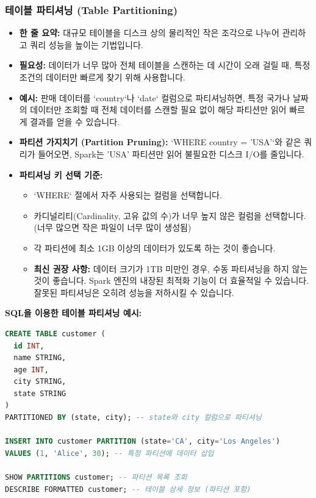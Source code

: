 \documentclass[11pt,a4paper]{article}
\begin{document}
\subsubsection{테이블 파티셔닝 (Table Partitioning)}
\begin{itemize}
    \item \textbf{한 줄 요약:} 대규모 테이블을 디스크 상의 물리적인 작은 조각으로 나누어 관리하고 쿼리 성능을 높이는 기법입니다.
    \item \textbf{필요성:} 데이터가 너무 많아 전체 테이블을 스캔하는 데 시간이 오래 걸릴 때, 특정 조건의 데이터만 빠르게 찾기 위해 사용합니다.
    \item \textbf{예시:} 판매 데이터를 `country`나 `date` 컬럼으로 파티셔닝하면, 특정 국가나 날짜의 데이터만 조회할 때 전체 데이터를 스캔할 필요 없이 해당 파티션만 읽어 빠르게 결과를 얻을 수 있습니다.
    \item \textbf{파티션 가지치기 (Partition Pruning):} `WHERE country = 'USA'`와 같은 쿼리가 들어오면, Spark는 'USA' 파티션만 읽어 불필요한 디스크 I/O를 줄입니다.
    \item \textbf{파티셔닝 키 선택 기준:}
    \begin{itemize}
        \item `WHERE` 절에서 자주 사용되는 컬럼을 선택합니다.
        \item 카디널리티(Cardinality, 고유 값의 수)가 너무 높지 않은 컬럼을 선택합니다. (너무 많으면 작은 파일이 너무 많이 생성됨)
        \item 각 파티션에 최소 1GB 이상의 데이터가 있도록 하는 것이 좋습니다.
        \item \textbf{최신 권장 사항:} 데이터 크기가 1TB 미만인 경우, 수동 파티셔닝을 하지 않는 것이 좋습니다. Spark 엔진의 내장된 최적화 기능이 더 효율적일 수 있습니다. 잘못된 파티셔닝은 오히려 성능을 저하시킬 수 있습니다.
    \end{itemize}
\end{itemize}

\begin{examplebox}
\textbf{SQL을 이용한 테이블 파티셔닝 예시:}
\begin{lstlisting}[language=SQL, caption=테이블 파티셔닝 정의, label=lst:partition_ddl]
CREATE TABLE customer (
  id INT,
  name STRING,
  age INT,
  city STRING,
  state STRING
)
PARTITIONED BY (state, city); -- state와 city 컬럼으로 파티셔닝

INSERT INTO customer PARTITION (state='CA', city='Los Angeles')
VALUES (1, 'Alice', 30); -- 특정 파티션에 데이터 삽입

SHOW PARTITIONS customer; -- 파티션 목록 조회
DESCRIBE FORMATTED customer; -- 테이블 상세 정보 (파티션 포함)
\end{lstlisting}
\end{examplebox}
\end{document}
